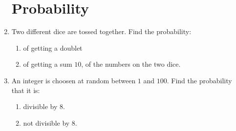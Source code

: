 \documentclass{article}
\begin{document}
\begin{enumerate}
\section{Probability}
	\item Two different dice are tossed together. Find the probability:\\
		\begin{enumerate}[label=(\roman*)]
	\item of getting a doublet
	\item of getting a sum $10$, of the numbers on the two dice.
\end{enumerate}
\item An integer is choosen at random between $1$ and $100$. Find the probability that it is: \\
	\begin{enumerate}[label=(\roman*)]
		\item divisible by $8$.
		\item not divisible by $8$.
	\end{enumerate}
\end{enumerate}
\end{document}
